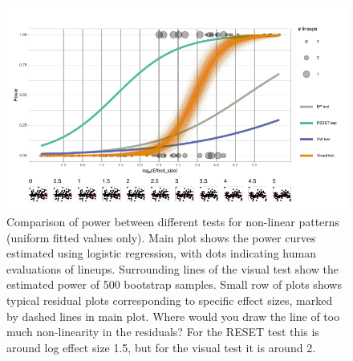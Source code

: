 \documentclass[]{interact}
\theoremstyle{plain}%
\theoremstyle{definition}
\theoremstyle{remark}
\begin{document}
\begin{figure}

{\centering \includegraphics[width=1\linewidth]{paper_comparison_files/figure-latex/polypower-1} 

}

\caption{Comparison of power between different tests for non-linear patterns (uniform fitted values only). Main plot shows the power curves estimated using logistic regression, with dots indicating human evaluations of lineups. Surrounding lines of the visual test show the estimated power of 500 bootstrap samples. Small row of plots shows typical residual plots corresponding to specific effect sizes, marked by dashed lines in main plot. Where would you draw the line of too much non-linearity in the residuals? For the RESET test this is around log effect size 1.5, but for the visual test it is around 2.}\label{fig:polypower}
\end{figure}
\end{document}
